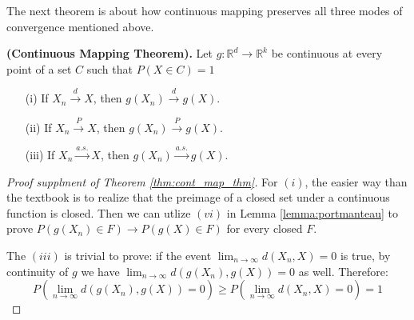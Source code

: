 \documentclass{article}
\begin{document}
The next theorem is about how continuous mapping preserves all three modes of convergence mentioned above.

\begin{theorem}
    \label{thm:cont_map_thm}
    \textbf{(Continuous Mapping Theorem).} Let $g: \mathbb{R}^d \to \mathbb{R}^k$ be continuous at every point of a set \( C \) such that \( P(X \in C) = 1 \)
    \begin{enumerate}
        \item[(i)] If $X_n \xrightarrow{d} X$, then $g(X_n) \xrightarrow{d} g(X)$.
        \item[(ii)] If $X_n \xrightarrow{P} X$, then $g(X_n) \xrightarrow{P} g(X)$.
        \item[(iii)] If $X_n \xrightarrow{a.s.} X$, then $g(X_n) \xrightarrow{a.s.} g(X)$.
    \end{enumerate}
\end{theorem}

\begin{proof}[Proof supplment of Theorem \ref*{thm:cont_map_thm}]
    For $(i)$, the easier way than the textbook is to realize that the preimage of a closed set under a continuous function is closed. Then we can utlize $(vi)$ in Lemma \ref{lemma:portmanteau} to prove $P(g(X_n) \in F) \to P(g(X) \in F)$ for every closed $F$.

    The $(iii)$ is trivial to prove: if the event $\lim_{n\to\infty}d(X_n, X) = 0$ is true, by continuity of $g$ we have $\lim_{n\to\infty}d(g(X_n), g(X)) = 0$ as well. Therefore:
    \begin{equation}
        P\left(\lim_{n\to\infty}d(g(X_n), g(X)) = 0\right) \geq P\left(\lim_{n\to\infty}d(X_n, X) = 0\right) = 1
    \end{equation}
\end{proof}

% 
% 
\end{document}

